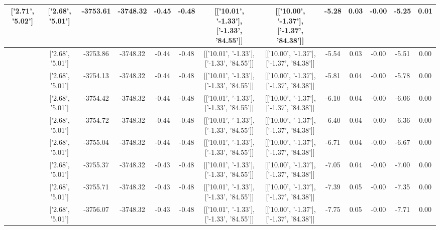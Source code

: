 \begin{table}[htbp]
\begin{adjustbox}{angle=90}
\begin{tabular}{|c|c|c|c|c|c|c|c|c|c|c|c|c|}
 ['2.71', '5.02'] & ['2.68', '5.01'] & -3753.61 & -3748.32 & -0.45 & -0.48 & [['10.01', '-1.33'], ['-1.33', '84.55']] & [['10.00', '-1.37'], ['-1.37', '84.38']] & -5.28 & 0.03 & -0.00 & -5.25 & 0.01\\ \hline
 ['2.71', '5.02'] & ['2.68', '5.01'] & -3753.86 & -3748.32 & -0.44 & -0.48 & [['10.01', '-1.33'], ['-1.33', '84.55']] & [['10.00', '-1.37'], ['-1.37', '84.38']] & -5.54 & 0.03 & -0.00 & -5.51 & 0.00\\ \hline
 ['2.71', '5.02'] & ['2.68', '5.01'] & -3754.13 & -3748.32 & -0.44 & -0.48 & [['10.01', '-1.33'], ['-1.33', '84.55']] & [['10.00', '-1.37'], ['-1.37', '84.38']] & -5.81 & 0.04 & -0.00 & -5.78 & 0.00\\ \hline
 ['2.71', '5.02'] & ['2.68', '5.01'] & -3754.42 & -3748.32 & -0.44 & -0.48 & [['10.01', '-1.33'], ['-1.33', '84.55']] & [['10.00', '-1.37'], ['-1.37', '84.38']] & -6.10 & 0.04 & -0.00 & -6.06 & 0.00\\ \hline
 ['2.71', '5.02'] & ['2.68', '5.01'] & -3754.72 & -3748.32 & -0.44 & -0.48 & [['10.01', '-1.33'], ['-1.33', '84.55']] & [['10.00', '-1.37'], ['-1.37', '84.38']] & -6.40 & 0.04 & -0.00 & -6.36 & 0.00\\ \hline
 ['2.71', '5.02'] & ['2.68', '5.01'] & -3755.04 & -3748.32 & -0.44 & -0.48 & [['10.01', '-1.33'], ['-1.33', '84.55']] & [['10.00', '-1.37'], ['-1.37', '84.38']] & -6.71 & 0.04 & -0.00 & -6.67 & 0.00\\ \hline
 ['2.71', '5.02'] & ['2.68', '5.01'] & -3755.37 & -3748.32 & -0.43 & -0.48 & [['10.01', '-1.33'], ['-1.33', '84.55']] & [['10.00', '-1.37'], ['-1.37', '84.38']] & -7.05 & 0.04 & -0.00 & -7.00 & 0.00\\ \hline
 ['2.71', '5.02'] & ['2.68', '5.01'] & -3755.71 & -3748.32 & -0.43 & -0.48 & [['10.01', '-1.33'], ['-1.33', '84.55']] & [['10.00', '-1.37'], ['-1.37', '84.38']] & -7.39 & 0.05 & -0.00 & -7.35 & 0.00\\ \hline
 ['2.72', '5.02'] & ['2.68', '5.01'] & -3756.07 & -3748.32 & -0.43 & -0.48 & [['10.01', '-1.33'], ['-1.33', '84.55']] & [['10.00', '-1.37'], ['-1.37', '84.38']] & -7.75 & 0.05 & -0.00 & -7.71 & 0.00\\ \hline
            \end{tabular}
        \end{adjustbox}
        \caption{}
        \label{}
    \end{table}
    